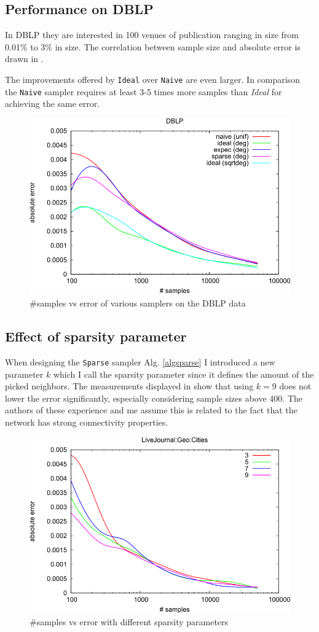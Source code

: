 \subsection{Performance on DBLP}
In DBLP they are interested in 100 venues of publication ranging in size from 0.01\% to 3\% in size. The correlation between sample size and absolute error is drawn in .

The improvements offered by \texttt{Ideal} over \texttt{Naive} are even larger. In comparison the \texttt{Naive} sampler requires at least 3-5 times more samples than \textit{Ideal} for achieving the same error.
\begin{figure}[!ht]
  \begin{center}
    \includegraphics[width=0.5\linewidth]{fig4}
    \caption{\#samples vs error of various samplers on the DBLP data \cite{dasgupta2012social}}
  \end{center}
\end{figure}
\subsection{Effect of sparsity parameter}
When designing the \texttt{Sparse} sampler Alg. \ref{algsparse} I introduced a new parameter $k$ which I call the sparsity parameter since it defines the amount of the picked neighbors.
The measurements displayed in  show that using $k=9$ does not lower the error significantly, especially considering sample sizes above 400.
The authors of these experience and me assume this is related to the fact that the network has strong connectivity properties.
\begin{figure}[!ht]
  \begin{center}
    \includegraphics[width=0.5\linewidth]{fig7b}
    \caption{\#samples vs error with different sparsity parameters \cite{dasgupta2012social}}
  \end{center}
\end{figure}
